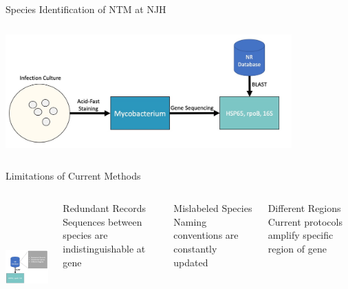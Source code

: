 \documentclass[11pt]{beamer}
\begin{document}
\subsection{}
	\begin{frame}{Species Identification of NTM at NJH}

	\includegraphics[height=5cm, width=11cm]{CPBS_11_18/NJH_Protocol.jpg}
	
	\end{frame}
	\begin{frame}{Limitations of Current Methods}
	
	\begin{columns}
	\includegraphics[height=5cm, width=5.5cm]{CPBS_11_18/Issues.jpg}
	\begin{block}{Redundant Records}
	Sequences between species are indistinguishable at gene
	\end{block}
	\begin{block}{Mislabeled Species}
	Naming conventions are constantly updated
	\end{block}
	\begin{block}{Different Regions}
	Current protocols amplify specific region of gene
	\end{block}
	\end{columns}
	
	\end{frame}
\end{document}
